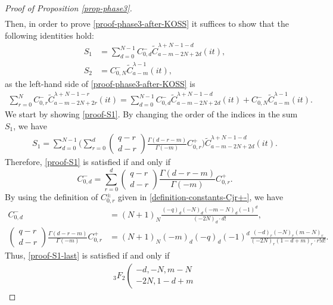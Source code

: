 \documentclass[12pt, pdflatex, a4paper]{article}
\theoremstyle{plain}
\theoremstyle{definition}
\def\Geg{\widetilde{C}}
\begin{document}
\begin{proof}[Proof of Proposition \ref{prop-phase3}]
\begin{align*}
\end{align*}
Then, in order to prove \eqref{proof-phase3-after-KOSS} it suffices to show that the following identities hold:
\begin{align}
\label{proof-S1}
S_1 & =\sum_{d=0}^{N-1}C_{0,d}^-\Geg_{a-m-2N+2d}^{\lambda+N-1-d}(it),\\
\label{proof-S2}
S_2 &= C_{0,N}^-\Geg_{a-m}^{\lambda-1}(it),
\end{align}
as the left-hand side of \eqref{proof-phase3-after-KOSS} is
\begin{align*}
\sum_{r=0}^{N}C_{0,r}^-\Geg_{a-m-2N+2r}^{\lambda+N-1-r}(it) = \sum_{d=0}^{N-1}C_{0,d}^-\Geg_{a-m-2N+2d}^{\lambda+N-1-d}(it) + C_{0,N}^-\Geg_{a-m}^{\lambda-1}(it).
\end{align*}
We start by showing \eqref{proof-S1}. By changing the order of the indices in the sum $S_1$, we have 
\begin{align*}
S_1 = \sum_{d=0}^{N-1}\Big(\sum_{r=0}^{d}
\begin{pmatrix}
q-r\\
d-r
\end{pmatrix}
\frac{\Gamma(d-r-m)}{\Gamma(-m)}C_{0,r}^+\Big)\Geg_{a-m-2N+2d}^{\lambda+N-1-d}(it).
\end{align*}
Therefore, \eqref{proof-S1} is satisfied if and only if
\begin{equation}\label{proof-S1-last}
C_{0,d}^- = \sum_{r=0}^{d}
\begin{pmatrix}
q-r\\
d-r
\end{pmatrix}
\frac{\Gamma(d-r-m)}{\Gamma(-m)}C_{0,r}^+.
\end{equation}
By using the definition of $C_{0,r}^\pm$ given in \eqref{definition-constants-Cjr+-}, we have
\begin{align*}
C_{0, d}^- &= (N+1)_N \frac{(-q)_d(-N)_d(-m-N)_d(-1)^d}{(-2N)_d \cdot d!},\\
\begin{pmatrix}
q-r\\
d-r
\end{pmatrix}
\frac{\Gamma(d-r-m)}{\Gamma(-m)}C_{0,r}^+ &= 
(N+1)_N (-m)_d (-q)_d (-1)^d \frac{(-d)_r(-N)_r (m-N)_r}{(-2N)_r (1-d+m)_r \cdot r! d!}.
\end{align*}
Thus, \eqref{proof-S1-last} is satisfied if and only if
\begin{align*}
{}_3F_2\left(
\begin{matrix}
-d, -N, m-N\\
-2N, 1-d+m
\end{matrix}

\end{align*}
\end{proof}
\end{document}

